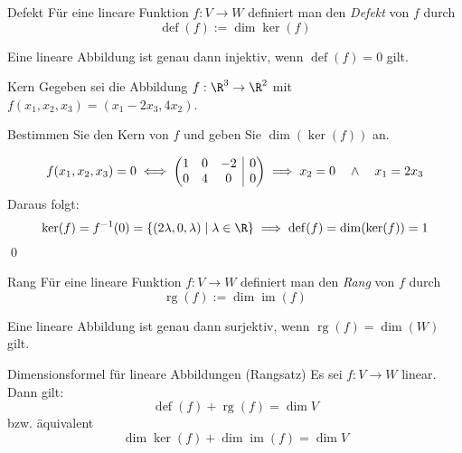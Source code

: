 \documentclass[german]{../spicker}
\makeatletter
\newcommand{\im}{\operatorname{im}}
\newcommand{\rg}{\operatorname{rg}}
\newcommand{\defect}{\operatorname{def}}
\newenvironment{sysmatrix}[1]
 {\left(\begin{array}{@{}#1@{}}}
 {\end{array}\right)}
\makeatother
\begin{document}
\begin{bonus}{Defekt}
    Für eine lineare Funktion $f: V\to W$ definiert man den \emph{Defekt} von $f$ durch
    $$
        \defect (f) := \dim\ker (f)
    $$

    Eine lineare Abbildung ist genau dann injektiv, wenn $\defect (f) = 0$ gilt.
\end{bonus}

\begin{example}{Kern}
    Gegeben sei die Abbildung $f : \R^3 \to \R^2$ mit $f(x_1, x_2, x_3) = (x_1-2x_3, 4x_2)$.

    Bestimmen Sie den Kern von $f$ und geben Sie $\dim(\ker(f))$ an.

    \exampleseparator

    $$
        f(x_1, x_2, x_3) = 0 \iff
        \begin{sysmatrix}{ccc|c}
            1 & 0 & -2 & 0 \\
            0 & 4 & 0  & 0
        \end{sysmatrix}
        \implies x_2 = 0 \quad \land \quad x_1 = 2x_3
    $$
    Daraus folgt:
    $$
        \ker(f) = f^{-1}(0) = \left\{ (2\lambda, 0, \lambda) \mid \lambda \in \R \right\} \implies \defect(f) = \dim(\ker(f)) = 1
    $$\qed
\end{example}

\begin{defi}{Rang}
    Für eine lineare Funktion $f: V\to W$ definiert man den \emph{Rang} von $f$ durch
    $$
        \rg (f) := \dim\im (f)
    $$

    Eine lineare Abbildung ist genau dann surjektiv, wenn $\rg (f) = \dim (W)$ gilt.
\end{defi}

\begin{defi}{Dimensionsformel für lineare Abbildungen (Rangsatz)}
    Es sei $f : V \to W$ linear. Dann gilt:
    $$
        \defect (f) + \rg (f) = \dim V
    $$
    bzw. äquivalent
    $$
        \dim\ker (f) + \dim\im (f) = \dim V
    $$
\end{defi}
\end{document}
